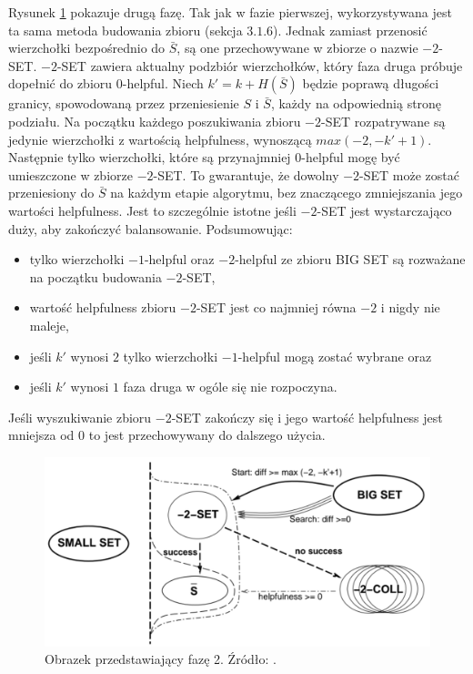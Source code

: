 Rysunek \ref{im:phase_2} pokazuje drugą fazę.
Tak jak w fazie pierwszej, wykorzystywana jest ta sama metoda budowania zbioru (sekcja $3.1.6$).
Jednak zamiast przenosić wierzchołki bezpośrednio do $\bar{S}$, są one przechowywane w zbiorze o nazwie $-2$-SET.
$-2$-SET zawiera aktualny podzbiór wierzchołków, który faza druga próbuje dopełnić do zbioru $0$-helpful.
Niech $k' = k + H(\bar{S})$ będzie poprawą długości granicy, spowodowaną przez przeniesienie $S$ i $\bar{S}$, każdy
na odpowiednią stronę podziału.
Na początku każdego poszukiwania zbioru $-2$-SET rozpatrywane są jedynie wierzchołki z wartością helpfulness, wynoszącą
$max(-2, -k'+1)$.
Następnie tylko wierzchołki, które są przynajmniej $0$-helpful mogę być umieszczone w zbiorze $-2$-SET.
To gwarantuje, że dowolny $-2$-SET może zostać przeniesiony do $\bar{S}$ na każdym etapie algorytmu, bez znaczącego
zmniejszania jego wartości helpfulness.
Jest to szczególnie istotne jeśli $-2$-SET jest wystarczająco duży, aby zakończyć balansowanie.
Podsumowując:
\begin{itemize}
    \item {tylko wierzchołki $-1$-helpful oraz $-2$-helpful ze zbioru BIG SET są rozważane na początku budowania $-2$-SET,}
    \item wartość helpfulness zbioru $-2$-SET jest co najmniej równa $-2$ i nigdy nie maleje,
    \item jeśli $k'$ wynosi $2$ tylko wierzchołki $-1$-helpful mogą zostać wybrane oraz
    \item jeśli $k'$ wynosi $1$ faza druga w ogóle się nie rozpoczyna.
\end{itemize}

Jeśli wyszukiwanie zbioru $-2$-SET zakończy się i jego wartość helpfulness jest mniejsza od $0$ to jest przechowywany
do dalszego użycia.
\begin{figure}[h]
    \centering
    \includegraphics[width=0.65\linewidth]{images/phase2}
    \caption{Obrazek przedstawiający fazę 2. Źródło: \cite{article}.}
    \label{im:phase_2}
\end{figure}
\newpage

